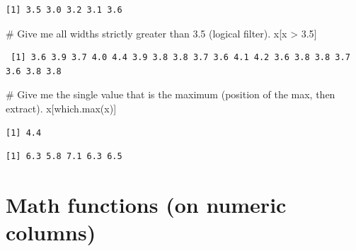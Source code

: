 \documentclass[
  letterpaper,
  DIV=11,
  numbers=noendperiod]{scrreprt}
\newenvironment{Shaded}{\begin{snugshade}}{\end{snugshade}}
\newcommand{\CommentTok}[1]{\textcolor[rgb]{0.37,0.37,0.37}{#1}}
\newcommand{\DecValTok}[1]{\textcolor[rgb]{0.68,0.00,0.00}{#1}}
\newcommand{\FloatTok}[1]{\textcolor[rgb]{0.68,0.00,0.00}{#1}}
\newcommand{\FunctionTok}[1]{\textcolor[rgb]{0.28,0.35,0.67}{#1}}
\newcommand{\NormalTok}[1]{\textcolor[rgb]{0.00,0.23,0.31}{#1}}
\newcommand{\SpecialCharTok}[1]{\textcolor[rgb]{0.37,0.37,0.37}{#1}}
\newcommand{\StringTok}[1]{\textcolor[rgb]{0.13,0.47,0.30}{#1}}
\begin{document}
\begin{verbatim}
[1] 3.5 3.0 3.2 3.1 3.6
\end{verbatim}

\begin{Shaded}
\begin{Highlighting}[]
\CommentTok{\# Give me all widths strictly greater than 3.5 (logical filter).}
\NormalTok{x[x }\SpecialCharTok{\textgreater{}} \FloatTok{3.5}\NormalTok{]}
\end{Highlighting}
\end{Shaded}

\begin{verbatim}
 [1] 3.6 3.9 3.7 4.0 4.4 3.9 3.8 3.8 3.7 3.6 4.1 4.2 3.6 3.8 3.8 3.7 3.6 3.8 3.8
\end{verbatim}

\begin{Shaded}
\begin{Highlighting}[]
\CommentTok{\# Give me the single value that is the maximum (position of the max, then extract).}
\NormalTok{x[}\FunctionTok{which.max}\NormalTok{(x)]}
\end{Highlighting}
\end{Shaded}

\begin{verbatim}
[1] 4.4
\end{verbatim}

\begin{Shaded}
\end{Shaded}

\begin{verbatim}
[1] 6.3 5.8 7.1 6.3 6.5
\end{verbatim}

\section{Math functions (on numeric
columns)}\label{math-functions-on-numeric-columns}

\begin{Shaded}
\end{Shaded}
\end{document}
